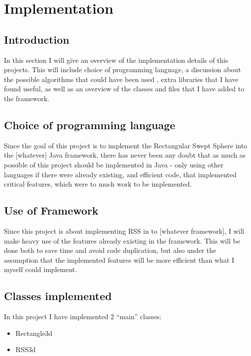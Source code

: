 
\section{Implementation}
\label{implementation}

\subsection{Introduction}
In this section I will give an overview of the implementation details of this projects. This will include choice of programming language, a discussion about the possible algorithms that could have been used , extra libraries that I have found useful, as well as an overview of the classes and files that I have added to the framework.

\subsection{Choice of programming language}
Since the goal of this project is to implement the Rectangular Swept Sphere into the [whatever]  Java framework, there has never been any doubt that as much as possible of this project should be implemented in Java - only using other languages if there were already existing, and efficient code, that implemented critical features, which were to much work to be implemented.

\subsection{Use of Framework}
Since this project is about implementing RSS in to [whatever framework], I will make heavy use of the features already existing in the framework. This will be done both to save time and avoid code duplication, but also under the assumption that the implemented features will be more efficient than what I myself could implement.

\subsection{Classes implemented}
In this project I have implemented 2 ``main'' classes:
\begin{itemize}
\item Rectangle3d
\item RSS3d
\end{itemize}

